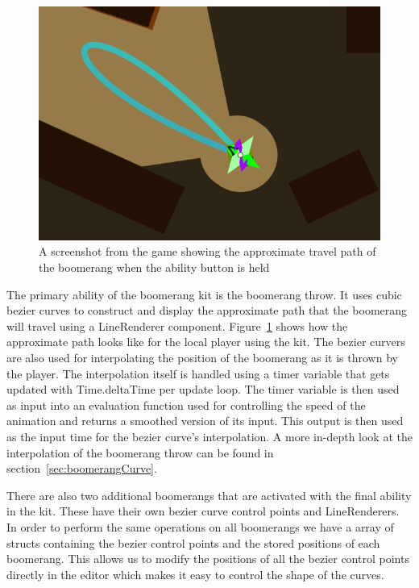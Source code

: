\begin{figure}[tbph]  %
  \centering
  \includegraphics[width=.75\textwidth]{images/boomerangKitLineRenderer}
  \caption[Approximate travel path of the boomerang]{A screenshot from the game showing the approximate travel path of the boomerang when the ability button is held}
  \label{fig:boomerangLineRenderer}
\end{figure}

The primary ability of the boomerang kit is the boomerang throw. It uses cubic bezier curves to construct and display the approximate path that the boomerang will travel using a LineRenderer component. Figure~\ref{fig:boomerangLineRenderer} shows how the approximate path looks like for the local player using the kit. 
The bezier curvers are also used for interpolating the position of the boomerang as it is thrown by the player. The interpolation itself is handled using a timer variable that gets updated with Time.deltaTime per update loop. The timer variable is then used as input into an evaluation function used for controlling the speed of the animation and returns a smoothed version of its input. This output is then used as the input time for the bezier curve's interpolation. A more in-depth look at the interpolation of the boomerang throw can be found in section~\ref{sec:boomerangCurve}. 
    
There are also two additional boomerangs that are activated with the final ability in the kit. These have their own bezier curve control points and LineRenderers.
In order to perform the same operations on all boomerangs we have a array of structs containing the bezier control points and the stored positions of each boomerang. This allows us to modify the positions of all the bezier control points directly in the editor which makes it easy to control the shape of the curves.  

